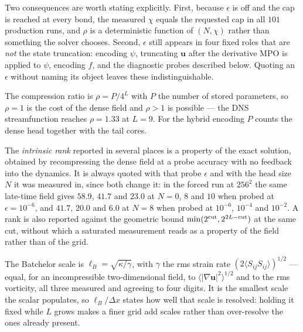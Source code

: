 \documentclass[aps,prfluids,reprint,onecolumn,amsmath,amssymb,nofootinbib,floatfix]{revtex4-2}
\begin{document}
\begin{table}[h]
\centering
\small
\TabSymbols
\caption{The three symbols by object. The bond cap $\chi$ on $\theta$ is the
only quantity swept; the SVD threshold $\epsilon$ on $\theta$ is disabled in the
production runs, so truncation is governed by the cap alone; and $\rho$ is
measured after the fact.}
\label{tab:symbols}
\end{table}

Two consequences are worth stating explicitly. First, because $\epsilon$ is off
and the cap is reached at every bond, the measured $\chi$ equals the requested
cap in all $101$ production runs, and $\rho$ is a deterministic function of
$(N,\chi)$ rather than something the solver chooses. Second, $\epsilon$ still
appears in four fixed roles that are \emph{not} the state truncation: encoding
$\psi$, truncating $\mathbf{u}$ after the derivative MPO is applied to $\psi$,
encoding $f$, and the diagnostic probes described below. Quoting an $\epsilon$
without naming its object leaves these indistinguishable.

The compression ratio is $\rho=P/4^L$ with $P$ the number of stored parameters,
so $\rho=1$ is the cost of the dense field and $\rho>1$ is possible --- the DNS
streamfunction reaches $\rho=1.33$ at $L=9$. For the hybrid encoding $P$ counts
the dense head together with the tail cores.

The \emph{intrinsic rank} reported in several places is a property of the exact
solution, obtained by recompressing the dense field at a probe accuracy with no
feedback into the dynamics. It is always quoted with that probe $\epsilon$ and
with the head size $N$ it was measured in, since both change it: in the forced
run at $256^2$ the same late-time field gives $58.9$, $41.7$ and $23.0$ at $N=0$, $8$ and
$10$ when probed at $\epsilon=10^{-6}$, and $41.7$, $20.0$ and $6.0$ at $N=8$
when probed at $10^{-6}$, $10^{-4}$ and $10^{-2}$. A rank is also reported
against the geometric bound $\min(2^{\rm cut},2^{2L-{\rm cut}})$ at the same
cut, without which a saturated measurement reads as a property of the field
rather than of the grid.

The Batchelor scale is $\ell_B=\sqrt{\kappa/\gamma}$, with $\gamma$ the rms
strain rate $(2\langle S_{ij}S_{ij}\rangle)^{1/2}$ --- equal, for an
incompressible two-dimensional field, to $\langle|\nabla\mathbf{u}|^2\rangle^{1/2}$
and to the rms vorticity, all three measured and agreeing to four digits. It is
the smallest scale the scalar populates, so $\ell_B/\Delta x$ states how well
that scale is resolved: holding it fixed while $L$ grows makes a finer grid add
scales rather than over-resolve the ones already present.
\end{document}
